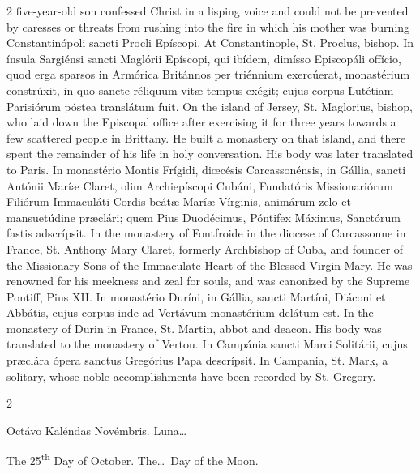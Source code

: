 \begin{paracol}{2}
 five-year-old son confessed Christ in a lisping voice and could not be 
 prevented by caresses or threats from rushing into the fire in which his 
 mother was burning
\switchcolumn*
{}
Constantinópoli sancti 
 Procli Epíscopi.
\switchcolumn
{}
At Constantinople, St. Proclus, 
 bishop.
\switchcolumn*
{}
In ínsula Sargiénsi sancti Maglórii Epíscopi, qui ibídem, dimísso Episcopáli offício, quod erga 
 sparsos in Armórica Británnos per triénnium exercúerat, monastérium 
 constrúxit, in quo sancte réliquum vitæ tempus exégit; cujus corpus Lutétiam 
 Parisiórum póstea translátum fuit.
\switchcolumn
{}
On the island of Jersey, St. 
 Maglorius, bishop, who laid down the Episcopal office after exercising it 
 for three years towards a few scattered people in Brittany. He built a 
 monastery on that island, and there spent the remainder of his life in holy 
 conversation. His body was later translated to Paris.
\switchcolumn*
{}
In monastério Montis 
 Frígidi, diœcésis Carcassonénsis, in Gállia, sancti Antónii Maríæ Claret, 
 olim Archiepíscopi Cubáni, Fundatóris Missionariórum Filiórum Immaculáti 
 Cordis beátæ Maríæ Vírginis, animárum zelo et mansuetúdine præclári; quem 
 Pius Duodécimus, Póntifex Máximus, Sanctórum fastis adscrípsit.
\switchcolumn
{}
In the monastery of Fontfroide in 
 the diocese of Carcassonne in France, St. Anthony Mary Claret, formerly 
 Archbishop of Cuba, and founder of the Missionary Sons of the Immaculate 
 Heart of the Blessed Virgin Mary. He was renowned for his meekness and 
 zeal for souls, and was canonized by the Supreme Pontiff, Pius XII.
\switchcolumn*
{}
In monastério Duríni, 
 in Gállia, sancti Martíni, Diáconi et Abbátis, cujus corpus inde ad Vertávum 
 monastérium delátum est.
\switchcolumn
{}
In the monastery of Durin in France, 
 St. Martin, abbot and deacon. His body was translated to the monastery 
 of Vertou.
\switchcolumn*
{}
In Campánia sancti 
 Marci Solitárii, cujus præclára ópera sanctus Gregórius Papa descrípsit.
\switchcolumn
{}
In Campania, St. Mark, a solitary, 
 whose noble accomplishments have been recorded by St. Gregory.
\switchcolumn*
{}
\end{paracol}


\begin{paracol}{2}
\begin{center}{\color{gregoriocolor} Octávo Kaléndas Novémbris. 
 Luna\dots\ }\end{center}
\switchcolumn
{}
\begin{center}{\color{gregoriocolor} The 
 25\textsuperscript{th} Day of 
 October. The\dots\ Day of the Moon.}\end{center}
\end{paracol}

